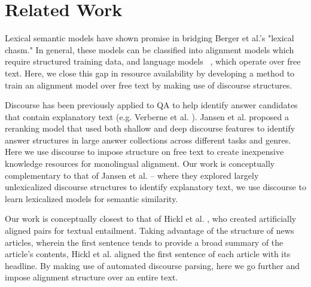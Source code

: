 
\section{Related Work}
\label{sec:related work}


Lexical semantic models have shown promise in bridging Berger et al.'s  "lexical chasm."  In general, these models can be classified into alignment models \cite{echihabi2003noisy,Soricut:06,Riezler:etal:2007,Surdeanu:11,yao2013} which require structured training data, and language models ~\cite{jansen14,sultan-etal:2014:TACL,yih13}, which operate over free text.  Here, we close this gap in resource availability by developing a method to train an alignment model over free text by making use of discourse structures. 

  
  

Discourse has been previously applied to QA to help identify answer candidates that contain explanatory text (e.g. Verberne et al. ).
Jansen et al.  proposed a reranking model that used both shallow and deep discourse features to identify answer structures in large answer collections across different tasks and genres.  Here we use discourse to impose structure on free text to create inexpensive knowledge resources for monolingual alignment. Our work is conceptually complementary to that of Jansen et al. -- where they explored largely unlexicalized discourse structures to identify explanatory text, we use discourse to learn lexicalized models for semantic similarity.

Our work is conceptually closest to that of Hickl et al. , who created artificially aligned pairs for textual entailment.  Taking advantage of the structure of news articles, wherein the first sentence tends to provide a broad summary of the article's contents, Hickl et al. aligned the first sentence of each article with its headline.  By making use of automated discourse parsing, here we go further and impose alignment structure over an entire text.



